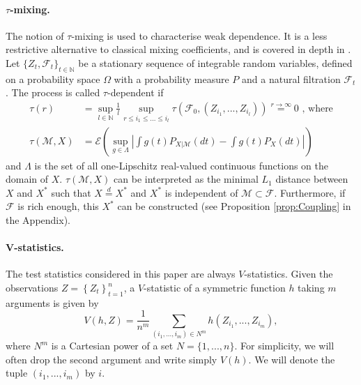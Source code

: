 \documentclass{article} %
\newcommand{\ev}{\mathcal{E}}
\begin{document}
\paragraph{$\tau$-mixing.} The notion of $\tau$-mixing is used to characterise weak dependence. It is a less restrictive alternative to classical mixing coefficients, and is covered in depth in \cite{dedecker2007weak}. Let $\{Z_t,\mathcal{F}_t\}_{t \in \mathbb{N}}$  be a stationary sequence of integrable random variables, defined on a probability space $\Omega$ with a probability measure $P$ and a natural filtration $\mathcal{F}_t$. The process  is called $\tau$-dependent if 
\begin{align*}
\tau(r) &= \sup_{l \in \mathbb{N}} \frac 1 l \sup_{ r \leq i_1 \leq ... \leq i_l} \tau( \mathcal F_0,(Z_{i_1},...,Z_{i_l}) )  \overset{r \to \infty}{=} 0 \text{ , where} \\
\tau(\mathcal{M},X) &=  \ev \left( \sup_{g \in \Lambda} \left| \int g(t) P_{X|\mathcal{M}}(dt) - \int g(t) P_X(dt) \right| \right)
\end{align*}
and $\Lambda$ is the set of all one-Lipschitz real-valued continuous functions on the domain of $X$. $\tau(\mathcal M,X)$ can be interpreted as the minimal $L_1$ distance between $X$ and $X^*$ such that $X \overset{d}{=}X^*$ and $X^*$ is independent of $\mathcal M \subset \mathcal F$. Furthermore, if $\mathcal F$ is rich enough, this $X^*$ can be constructed (see Proposition \ref{prop:Coupling} in the Appendix).
  

\paragraph{V-statistics.} The test statistics considered in this paper are always $V$-statistics. Given the observations $Z=\left\{Z_t\right\}_{t=1}^n$, a $V$-statistic of a symmetric function $h$ taking $m$ arguments is given by 
\begin{equation}
\label{def:Vstat}
V(h,Z) = \frac{1}{n^m} \sum_{(i_1,...,i_m) \in N^m} h(Z_{i_1},...,Z_{i_m}),
\end{equation}
where $N^m$ is a Cartesian power of a set $N= \{1,...,n\}$. For simplicity, we will often drop the second argument and write simply $V(h)$. We will  denote the tuple $(i_1,...,i_m)$ by $i$. %
\end{document}
